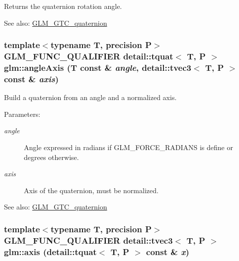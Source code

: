 Returns the quaternion rotation angle.

\begin{Desc}
\item[See also:]\hyperlink{group__gtc__quaternion}{GLM\_\-GTC\_\-quaternion} \end{Desc}
\hypertarget{group__gtc__quaternion_g96dbce7a48d76fa63e65c4ba949a3bc4}{
\subsubsection[angleAxis]{\setlength{\rightskip}{0pt plus 5cm}template$<$typename T, precision P$>$ GLM\_\-FUNC\_\-QUALIFIER detail::tquat$<$ T, P $>$ glm::angleAxis (T const \& {\em angle}, \/  detail::tvec3$<$ T, P $>$ const \& {\em axis})}}
\label{group__gtc__quaternion_g96dbce7a48d76fa63e65c4ba949a3bc4}


Build a quaternion from an angle and a normalized axis.

\begin{Desc}
\item[Parameters:]
\begin{description}
\item[{\em angle}]Angle expressed in radians if GLM\_\-FORCE\_\-RADIANS is define or degrees otherwise. \item[{\em axis}]Axis of the quaternion, must be normalized.\end{description}
\end{Desc}
\begin{Desc}
\item[See also:]\hyperlink{group__gtc__quaternion}{GLM\_\-GTC\_\-quaternion} \end{Desc}
\hypertarget{group__gtc__quaternion_g5c243b588291c790bf1b5ec3f0f08d1b}{
\subsubsection[axis]{\setlength{\rightskip}{0pt plus 5cm}template$<$typename T, precision P$>$ GLM\_\-FUNC\_\-QUALIFIER detail::tvec3$<$ T, P $>$ glm::axis (detail::tquat$<$ T, P $>$ const \& {\em x})}}
\label{group__gtc__quaternion_g5c243b588291c790bf1b5ec3f0f08d1b}


